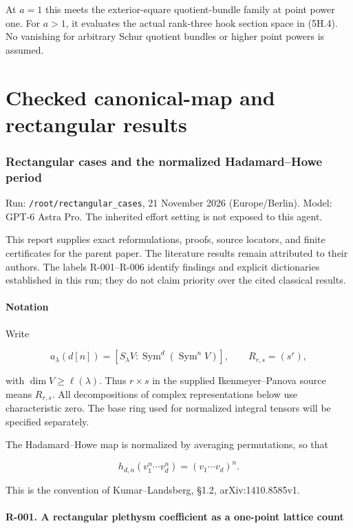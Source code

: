 \documentclass[
  10pt,
]{article}
\begin{document}
At \(a=1\) this meets the exterior-square quotient-bundle family at
point power one. For \(a>1\), it evaluates the actual rank-three hook
section space in (5H.4). No vanishing for arbitrary Schur quotient
bundles or higher point powers is assumed.

\part{Checked canonical-map and rectangular results}

\section{Rectangular cases and the normalized Hadamard--Howe
period}\label{rectangular-cases-and-the-normalized-hadamardhowe-period}

Run:
\texttt{\small /\allowbreak{}root/\allowbreak{}rectangular\_\allowbreak{}cases},
21 November 2026 (Europe/Berlin). Model: GPT-6 Astra Pro. The inherited
effort setting is not exposed to this agent.

This report supplies exact reformulations, proofs, source locators, and
finite certificates for the parent paper. The literature results remain
attributed to their authors. The labels R-001--R-006 identify findings
and explicit dictionaries established in this run; they do not claim
priority over the cited classical results.

\subsection{Notation}\label{notation-1}

Write

\[
a_\lambda(d[n])=[S_\lambda V:\operatorname{Sym}^d(\operatorname{Sym}^nV)],
\qquad R_{r,s}=(s^r),
\]

with \(\dim V\ge\ell(\lambda)\). Thus \(r\times s\) in the supplied
Ikenmeyer--Panova source means \(R_{r,s}\). All decompositions of
complex representations below use characteristic zero. The base ring
used for normalized integral tensors will be specified separately.

The Hadamard--Howe map is normalized by averaging permutations, so that

\[
h_{d,n}(v_1^n\cdots v_d^n)=(v_1\cdots v_d)^n.
\]

This is the convention of Kumar--Landsberg, §1.2, arXiv:1410.8585v1.

\subsection{R-001. A rectangular plethysm coefficient as a one-point
lattice
count}\label{r-001.-a-rectangular-plethysm-coefficient-as-a-one-point-lattice-count}
\end{document}
